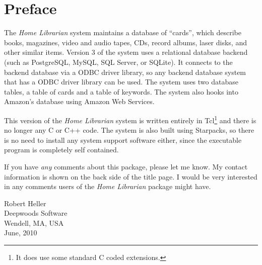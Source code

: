 \chapter*{Preface}
%


The {\em Home Librarian} system maintains a database of ``cards'',
which describe books, magazines, video and audio tapes, CDs, record
albums, laser disks, and other similar items. Version 3 of the system
uses a relational database backend (such as PostgreSQL, MySQL, SQL
Server, or SQLite). It connects to the backend database via a ODBC
driver library, so any backend database system that has a ODBC driver
library can be used.  The system uses two database tables, a table of
cards and a table of keywords.  The system also hooks into Amazon's
database using Amazon Web Services.

This version of the {\em Home Librarian} system is
written entirely in Tcl\footnote{It does use some standard C coded
extensions.} and there is no longer any C or C++ code. The system is
also built using Starpacks, so there is no need to install any system
support software either, since the executable program is completely
self contained.

If you have {\em any} comments about this package, please let me know.
My contact information is shown on the back side of the title page.
I would be very interested in any comments users of the {\em Home
Librarian} package might have.

\vspace{.25in}
\noindent
Robert Heller \\
Deepwoods Software \\
Wendell, MA, USA \\
June, 2010

